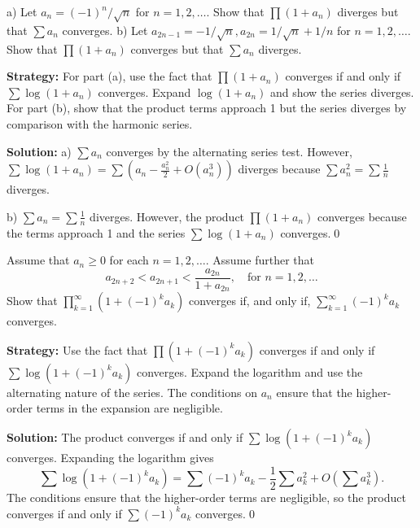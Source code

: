 \begin{problembox}
a) Let \(a_n = (-1)^n/\sqrt{n}\) for \(n = 1, 2, \ldots\). Show that \(\prod (1 + a_n)\) diverges but that \(\sum a_n\) converges.
b) Let \(a_{2n-1} = -1/\sqrt{n}, a_{2n} = 1/\sqrt{n} + 1/n\) for \(n = 1, 2, \ldots\). Show that \(\prod (1 + a_n)\) converges but that \(\sum a_n\) diverges.
\end{problembox}

\noindent\textbf{Strategy:} For part (a), use the fact that \(\prod(1+a_n)\) converges if and only if \(\sum \log(1+a_n)\) converges. Expand \(\log(1+a_n)\) and show the series diverges. For part (b), show that the product terms approach 1 but the series diverges by comparison with the harmonic series.

\bigskip\noindent\textbf{Solution:}
a) \(\sum a_n\) converges by the alternating series test. However, \(\sum \log(1+a_n) = \sum \left(a_n - \frac{a_n^2}{2} + O(a_n^3)\right)\) diverges because \(\sum a_n^2 = \sum \frac{1}{n}\) diverges.

b) \(\sum a_n = \sum \frac{1}{n}\) diverges. However, the product \(\prod(1+a_n)\) converges because the terms approach 1 and the series \(\sum \log(1+a_n)\) converges.\qed



\begin{problembox}
Assume that \(a_n \geq 0\) for each \(n = 1, 2, \ldots\). Assume further that
\[a_{2n+2} < a_{2n+1} < \frac{a_{2n}}{1 + a_{2n}}, \quad \text{for } n = 1, 2, \ldots\]
Show that \(\prod_{k=1}^{\infty} (1 + (-1)^k a_k)\) converges if, and only if, \(\sum_{k=1}^{\infty} (-1)^k a_k\) converges.
\end{problembox}

\noindent\textbf{Strategy:} Use the fact that \(\prod(1+(-1)^k a_k)\) converges if and only if \(\sum \log(1+(-1)^k a_k)\) converges. Expand the logarithm and use the alternating nature of the series. The conditions on \(a_n\) ensure that the higher-order terms in the expansion are negligible.

\bigskip\noindent\textbf{Solution:}
The product converges if and only if \(\sum \log(1+(-1)^k a_k)\) converges. Expanding the logarithm gives
\[\sum \log(1+(-1)^k a_k) = \sum (-1)^k a_k - \frac{1}{2}\sum a_k^2 + O(\sum a_k^3).\]
The conditions ensure that the higher-order terms are negligible, so the product converges if and only if \(\sum (-1)^k a_k\) converges.\qed




